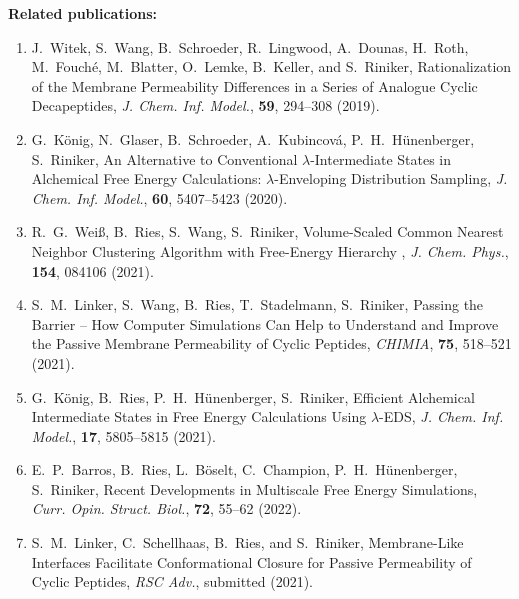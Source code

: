 \newpage
\noindent \textbf{Related publications:}
\begin{enumerate}
    \item J.\ Witek, S.\ Wang, B.\ Schroeder, R.\ Lingwood, A.\ Dounas, H.\ Roth, M.\ Fouché, M.\ Blatter, O.\ Lemke, B.\ Keller, and S.\ Riniker, Rationalization of the Membrane Permeability Differences in a Series of Analogue Cyclic Decapeptides, {\em J. Chem. Inf. Model.}, \textbf{59}, 294--308 (2019).
    \item  G.\ K\"onig, N.\ Glaser, B.\ Schroeder, A.\ Kubincová, P.\ H.\ H\"unenberger, S.\ Riniker, An Alternative to Conventional $\lambda$-Intermediate States in Alchemical Free Energy Calculations: $\lambda$-Enveloping Distribution Sampling, {\em J. Chem. Inf. Model.}, \textbf{60}, 5407--5423 (2020).
    \item R.\ G.\ Wei\ss, B.\ Ries, S.\ Wang, S.\ Riniker, Volume-Scaled Common Nearest Neighbor Clustering Algorithm with Free-Energy Hierarchy , {\em J. Chem. Phys.}, \textbf{154}, 084106 (2021).
    \item S.\ M.\ Linker, S.\ Wang, B.\ Ries, T.\ Stadelmann, S.\ Riniker, Passing the Barrier – How Computer Simulations Can Help to Understand and Improve the Passive Membrane Permeability of Cyclic Peptides, {\em CHIMIA}, \textbf{75}, 518--521 (2021).
    \item G.\ K\"onig, B.\ Ries, P.\ H.\ H\"unenberger, S.\ Riniker, Efficient Alchemical Intermediate States in Free Energy Calculations Using  $\lambda$-EDS, {\em J. Chem. Inf. Model.}, \textbf{17}, 5805--5815 (2021).
    \item E.\ P.\ Barros, B.\ Ries, L.\ B\"oselt, C.\ Champion, P.\ H.\ H\"unenberger, S.\ Riniker, Recent Developments in Multiscale Free Energy Simulations, {\em Curr. Opin. Struct. Biol.}, \textbf{72}, 55--62 (2022).
    \item S.\ M.\ Linker, C.\ Schellhaas, B.\ Ries, and S.\ Riniker, Membrane-Like Interfaces Facilitate Conformational Closure for Passive Permeability of Cyclic Peptides, {\em RSC Adv.}, submitted (2021).

\end{enumerate}
